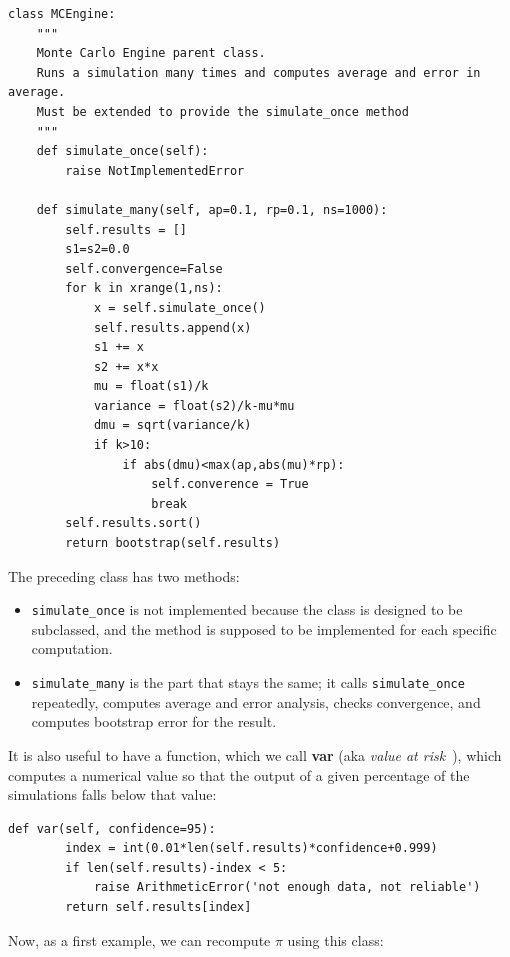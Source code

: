 \documentclass[justified,sixbynine]{tufte-book}
\def\ft{\small\tt}
\theoremstyle{plain}%
\theoremstyle{definition}
\theoremstyle{remark}
\begin{document}
\begin{fullwidth}

\begin{lstlisting}[caption={in file: {\ft nlib.py}}]
class MCEngine:
    """
    Monte Carlo Engine parent class.
    Runs a simulation many times and computes average and error in average.
    Must be extended to provide the simulate_once method
    """
    def simulate_once(self):
        raise NotImplementedError

    def simulate_many(self, ap=0.1, rp=0.1, ns=1000):
        self.results = []
        s1=s2=0.0
        self.convergence=False
        for k in xrange(1,ns):
            x = self.simulate_once()
            self.results.append(x)
            s1 += x
            s2 += x*x
            mu = float(s1)/k
            variance = float(s2)/k-mu*mu
            dmu = sqrt(variance/k)
            if k>10:
                if abs(dmu)<max(ap,abs(mu)*rp):
                    self.converence = True
                    break
        self.results.sort()
        return bootstrap(self.results)
\end{lstlisting}

The preceding class has two methods:
\begin{itemize}
\item {\ft simulate\_once} is not implemented because the class is designed to be subclassed, and the method is supposed to be implemented for each specific computation.
\item {\ft simulate\_many} is the part that stays the same; it calls {\ft simulate\_once} repeatedly, computes average and error analysis, checks convergence, and computes bootstrap error for the result.
\end{itemize}

It is also useful to have a function, which we call {\bf var} (aka {\it value at risk}~\cite{wilmott}), which computes a numerical value so that the output of a given percentage of the simulations falls below that value:

\begin{lstlisting}[caption={in file: {\ft nlib.py}}]
    def var(self, confidence=95):
        index = int(0.01*len(self.results)*confidence+0.999)
        if len(self.results)-index < 5:
            raise ArithmeticError('not enough data, not reliable')
        return self.results[index]
\end{lstlisting}

Now, as a first example, we can recompute $\pi$ using this class:


\end{fullwidth}
\end{document}
